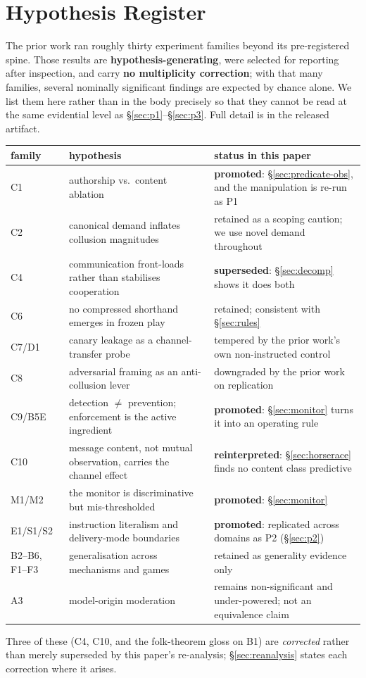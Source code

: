 \section{Hypothesis Register}
\label{app:register}

The prior work ran roughly thirty experiment families beyond its pre-registered spine.
Those results are \textbf{hypothesis-generating}, were selected for reporting after
inspection, and carry \textbf{no multiplicity correction}; with that many families,
several nominally significant findings are expected by chance alone. We list them here
rather than in the body precisely so that they cannot be read at the same evidential
level as \S\ref{sec:p1}--\S\ref{sec:p3}. Full detail is in the released artifact.

\begin{center}\small
{}%
\begin{tabularx}{\textwidth}{l Y l}
\toprule
family & hypothesis & status in this paper \\
\midrule
C1 & authorship vs.\ content ablation & \textbf{promoted}: \S\ref{sec:predicate-obs}, and
the manipulation is re-run as P1 \\
C2 & canonical demand inflates collusion magnitudes & retained as a scoping caution;
we use novel demand throughout \\
C4 & communication front-loads rather than stabilises cooperation & \textbf{superseded}:
\S\ref{sec:decomp} shows it does both \\
C6 & no compressed shorthand emerges in frozen play & retained; consistent with
\S\ref{sec:rules} \\
C7/D1 & canary leakage as a channel-transfer probe & tempered by the prior work's own
non-instructed control \\
C8 & adversarial framing as an anti-collusion lever & downgraded by the prior work on
replication \\
C9/B5E & detection $\neq$ prevention; enforcement is the active ingredient &
\textbf{promoted}: \S\ref{sec:monitor} turns it into an operating rule \\
C10 & message content, not mutual observation, carries the channel effect &
\textbf{reinterpreted}: \S\ref{sec:horserace} finds no content class predictive \\
M1/M2 & the monitor is discriminative but mis-thresholded & \textbf{promoted}:
\S\ref{sec:monitor} \\
E1/S1/S2 & instruction literalism and delivery-mode boundaries &
\textbf{promoted}: replicated across domains as P2 (\S\ref{sec:p2}) \\
B2--B6, F1--F3 & generalisation across mechanisms and games & retained as
generality evidence only \\
A3 & model-origin moderation & remains non-significant and under-powered; not an
equivalence claim \\
\bottomrule
\end{tabularx}
\end{center}

Three of these (C4, C10, and the folk-theorem gloss on B1) are \emph{corrected} rather
than merely superseded by this paper's re-analysis; \S\ref{sec:reanalysis} states each
correction where it arises.

